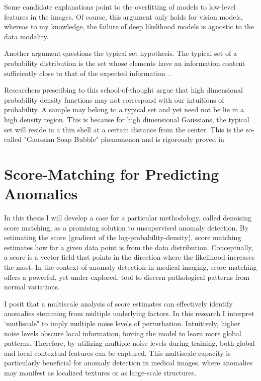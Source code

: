 Some candidate explanations point to the overfitting of models to low-level features in the images. Of course, this argument only holds for vision models, whereas to my knowledge, the failure of deep likelihood models is agnostic to the data modality.

Another argument questions the typical set hypothesis.
The typical set of a probability distribution is the set whose elements have an information content sufficiently close to that of the expected information~\cite{shannon_1948}.

Researchers prescribing to this school-of-thought argue that high dimensional probability density functions may not correspond with our intuitions of probability. A sample may belong to a typical set and yet need not be lie in a high density region. This is because for high dimensional Gaussians, the typical set will reside in a thin shell at a certain distance from the center. This is the so-called "Gaussian Soap Bubble" phenomenon and is rigorously proved in \cite{vershynin2018high}


\section{Score-Matching for Predicting Anomalies}

In this thesis I will develop a case for a particular methodology, called denoising score matching, as a promising solution to unsupervised anomaly detection. By estimating the score (gradient of the log-probability-density), score matching estimates how far a given data point is from the data distribution. Conceptually, a score is a vector field that points in the direction where the likelihood increases the most. In the context of anomaly detection in medical imaging, score matching offers a powerful, yet under-explored, tool to discern pathological patterns from normal variations.

I posit that a multiscale analysis of score estimates can effectively identify anomalies stemming from multiple underlying factors. In this research I interpret `mutliscale" to imply multiple noise levels of perturbation. Intuitively, higher noise levels obscure local information, forcing the model to learn more global patterns. Therefore, by utilizing multiple noise levels during training, both global and local contextual features can be captured. This multiscale capacity is particularly beneficial for anomaly detection in medical images, where anomalies may manifest as localized textures or as large-scale structures.


